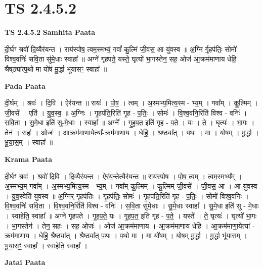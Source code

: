 \documentclass[17pt]{extarticle}
\begin{document}
\section*{ TS 2.4.5.2 }

\textbf{TS 2.4.5.2 } \newline
\textbf{Samhita Paata} \newline

दी॒र्घꣳ श्रवो॑ दि॒व्यैर॑यन्त । राय॑स्पोष॒ त्वम॒स्मभ्यं॒ गवां᳚ कु॒ल्मिं जी॒वस॒ आ यु॑वस्व ॥ अ॒ग्नि र्गृ॒हप॑तिः॒ सोमो॑ विश्व॒वनिः॑ सवि॒ता सु॑मे॒धाः स्वाहा᳚ ॥ अग्ने॑ गृहपते॒ यस्ते॒ घृत्यो॑ भा॒गस्तेन॒ सह॒ ओज॑ आ॒क्रम॑माणाय धेहि॒ श्रैष्‌ठ्या᳚त्प॒थो मा यो॑षं मू॒र्द्धा भू॑यासꣳ॒॒ स्वाहा᳚ ॥ \newline

\textbf{Pada Paata} \newline

दी॒र्घम् । श्रवः॑ । दि॒वि । ऐर॑यन्त ॥ रायः॑ । पो॒ष॒ । त्वम् । अ॒स्मभ्य॒मित्य॒स्म - भ्य॒म् । गवा᳚म् । कु॒ल्मिम् । जी॒वसे᳚ । एति॑ । यु॒व॒स्व॒ ॥ अ॒ग्निः । गृ॒हप॑ति॒रिति॑ गृ॒ह - प॒तिः॒ । सोमः॑ । वि॒श्व॒वनि॒रिति॑ विश्व - वनिः॑ । स॒वि॒ता । सु॒मे॒धा इति॑ सु-मे॒धाः । स्वाहा᳚ ॥ अग्ने᳚ । गृ॒ह॒प॒त॒ इति॑ गृह - प॒ते॒ । यः । ते॒ । घृत्यः॑ । भा॒गः । तेन॑ । सहः॑ । ओजः॑ । आ॒क्रम॑माणा॒येत्या᳚-क्रम॑माणाय । धे॒हि॒ । श्रष्ठ्या᳚त् । प॒थः । मा । यो॒ष॒म् । मू॒र्द्धा । भू॒या॒स॒म् । स्वाहा᳚ ॥  \newline


\textbf{Krama Paata} \newline

दी॒र्घꣳ श्रवः॑ । श्रवो॑ दि॒वि । दि॒व्यैर॑यन्त । ऐर॑य॒न्तेत्यैर॑यन्त ॥ राय॑स्पोष । पो॒ष॒ त्वम् । त्वम॒स्मभ्य᳚म् । अ॒स्मभ्य॒म् गवा᳚म् । अ॒स्मभ्य॒मित्य॒स्म - भ्य॒म् । गवा᳚म् कु॒ल्मिम् । कु॒ल्मिम् जी॒वसे᳚ । जी॒वस॒ आ । आ यु॑वस्व । यु॒व॒स्वेति॑ युवस्व ॥ अ॒ग्निर् गृ॒हप॑तिः । गृ॒हप॑तिः॒ सोमः॑ । गृ॒हप॑ति॒रिति॑ गृ॒ह - प॒तिः॒ । सोमो॑ विश्व॒वनिः॑ । वि॒श्व॒वनिः॑ सवि॒ता । वि॒श्व॒वनि॒रिति॑ विश्व - वनिः॑ । स॒वि॒ता सु॑मे॒धाः । सु॒मे॒धाः स्वाहा᳚ । सु॒मे॒धा इति॑ सु - मे॒धाः । स्वाहेति॒ स्वाहा᳚ ॥ अग्ने॑ गृहपते । गृ॒ह॒प॒ते॒ यः । गृ॒ह॒प॒त॒ इति॑ गृह - प॒ते॒ । यस्ते᳚ । ते॒ घृत्यः॑ । घृत्यो॑ भा॒गः । 
भा॒गस्तेन॑ । तेन॒ सहः॑ । सह॒ ओजः॑ । ओज॑ आ॒क्रम॑माणाय । आ॒क्रम॑माणाय धेहि । आ॒क्रम॑माणा॒येत्या᳚ - क्रम॑माणाय । धे॒हि॒ श्रैष्ठ्या᳚त् । श्रैष्ठ्या᳚त् प॒थः । प॒थो मा । मा यो॑षम् । यो॒ष॒म् मू॒र्द्धा । मू॒र्द्धा भू॑यासम् । भू॒या॒सꣳ॒॒ स्वाहा᳚ । 
स्वाहेति॒ स्वाहा᳚ । \newline

\textbf{Jatai Paata} \newline
\end{document}
